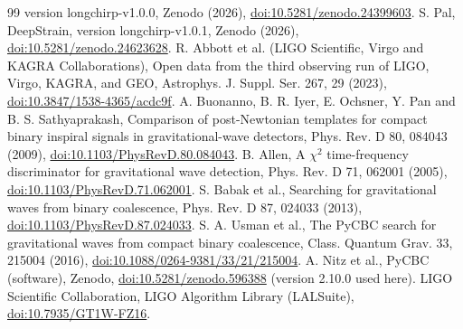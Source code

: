 \documentclass[11pt]{article}
\begin{document}
\begin{thebibliography}{99}
version longchirp-v1.0.0, Zenodo (2026), \href{https://doi.org/10.5281/zenodo.24399603}{doi:10.5281/zenodo.24399603}.
 S. Pal, DeepStrain, version longchirp-v1.0.1, Zenodo (2026), \href{https://doi.org/10.5281/zenodo.24623628}{doi:10.5281/zenodo.24623628}.
 R. Abbott et al. (LIGO Scientific, Virgo and KAGRA Collaborations), Open data from the third
observing run of LIGO, Virgo, KAGRA, and GEO, Astrophys. J. Suppl. Ser. 267, 29 (2023),
\href{https://doi.org/10.3847/1538-4365/acdc9f}{doi:10.3847/1538-4365/acdc9f}.
 A. Buonanno, B. R. Iyer, E. Ochsner, Y. Pan and B. S. Sathyaprakash, Comparison of
post-Newtonian templates for compact binary inspiral signals in gravitational-wave detectors, Phys. Rev. D 80, 084043
(2009), \href{https://doi.org/10.1103/PhysRevD.80.084043}{doi:10.1103/PhysRevD.80.084043}.
 B. Allen, A $\chi^2$ time-frequency discriminator for gravitational wave detection, Phys. Rev. D
71, 062001 (2005), \href{https://doi.org/10.1103/PhysRevD.71.062001}{doi:10.1103/PhysRevD.71.062001}.
 S. Babak et al., Searching for gravitational waves from binary coalescence, Phys. Rev. D 87,
024033 (2013), \href{https://doi.org/10.1103/PhysRevD.87.024033}{doi:10.1103/PhysRevD.87.024033}.
 S. A. Usman et al., The PyCBC search for gravitational waves from compact binary coalescence,
Class. Quantum Grav. 33, 215004 (2016), \href{https://doi.org/10.1088/0264-9381/33/21/215004}{doi:10.1088/0264-9381/33/21/215004}.
 A. Nitz et al., PyCBC (software), Zenodo, \href{https://doi.org/10.5281/zenodo.596388}{doi:10.5281/zenodo.596388}
(version 2.10.0 used here).
 LIGO Scientific Collaboration, LIGO Algorithm Library (LALSuite), \href{https://doi.org/10.7935/GT1W-FZ16}{doi:10.7935/GT1W-FZ16}.
\end{thebibliography}
\end{document}
